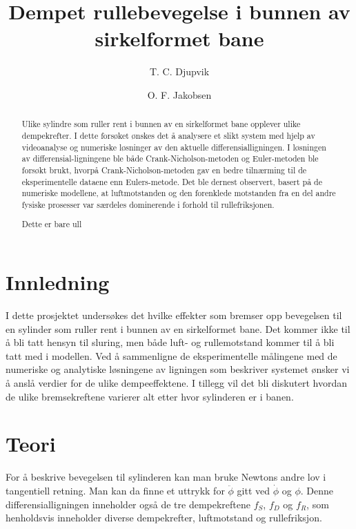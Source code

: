 \documentclass[5p]{elsarticle}
\title{Dempet rullebevegelse i bunnen av sirkelformet bane}
\author[fysikk]{T. C. Djupvik}
\author[fysikk]{O. F. Jakobsen}
\begin{document}
\begin{abstract}
Ulike sylindre som ruller rent i bunnen av en sirkelformet bane opplever ulike dempekrefter.
I dette forsøket ønskes det å analysere et slikt system med hjelp av videoanalyse og numeriske løsninger av den aktuelle differensial\-ligningen. I løsningen av differensial-ligningene ble både Crank-Nicholson-metoden og Euler-metoden ble forsøkt brukt, hvorpå Crank-Nicholson-metoden gav en bedre tilnærming til de eksperimentelle dataene enn Eulers-metode. Det ble dernest observert, basert på de numeriske modellene, at luftmotstanden og den forenklede motstanden fra en del andre fysiske prosesser var særdeles dominerende i forhold til rullefriksjonen.


Dette er bare ull
\end{abstract}

\maketitle %

\section{Innledning}
I dette prosjektet undersøkes det hvilke effekter som bremser opp bevegelsen 
til en sylinder som ruller rent i bunnen av en sirkelformet bane. Det kommer ikke til å 
bli tatt hensyn til sluring, men både luft- og rullemotstand kommer til å bli tatt med i modellen.
Ved å sammenligne de eksperimentelle målingene med de numeriske og analytiske løsningene av 
ligningen som beskriver systemet ønsker vi å anslå verdier for de ulike dempeeffektene. 
I tillegg vil det bli diskutert hvordan de ulike bremsekreftene varierer alt etter hvor sylinderen 
er i banen.

\section{Teori}

For å beskrive bevegelsen til sylinderen kan man bruke Newtons andre lov i tangentiell retning.
Man kan da finne et uttrykk for \(\ddot{\phi}\) gitt ved \(\dot{\phi}\) og \(\phi\). 
Denne differensialligningen inneholder også de tre dempekreftene \(f_S\), \(f_D\) og \(f_R\), 
som henholdsvis inneholder diverse dempekrefter, luftmotstand og rullefriksjon.
\end{document}
